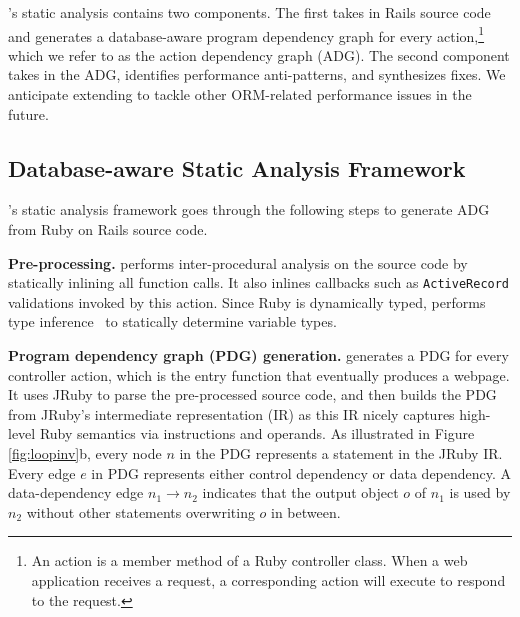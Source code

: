 \label{sec:impl}
\Tool's static analysis contains two components. The first takes in Rails source code and generates
a database-aware program dependency graph for every action,\footnote{An action is a member method of a
Ruby controller class. When a web application receives a request, a corresponding action will execute to respond to the request.}
which we refer to as the action
dependency graph (ADG). The second component takes in the ADG, identifies
performance anti-patterns, and synthesizes fixes. We anticipate extending \Tool to tackle other ORM-related performance issues in the future.



\subsection{Database-aware Static Analysis Framework} 
\Tool's static analysis framework goes through the following steps to generate ADG from Ruby on Rails source code.

\textbf{Pre-processing.} \Tool performs inter-procedural analysis on the source code by statically inlining all function calls. It also inlines callbacks such as {\tt ActiveRecord} validations invoked by this action. Since Ruby is dynamically typed, \Tool performs type inference~\cite{furr2009static} to statically determine variable types.




\textbf{Program dependency graph (PDG) generation.}
\Tool generates a PDG for every controller action, which is the entry function that eventually produces a webpage.   
It uses JRuby 
to parse the pre-processed source code, and then builds the PDG from JRuby's intermediate
representation (IR) as this IR nicely captures high-level Ruby semantics via instructions and operands.
As illustrated in Figure \ref{fig:loopinv}b, every node $n$ in the PDG represents a statement in the JRuby IR. 
Every edge $e$ in PDG represents either control dependency or data dependency.
A data-dependency
edge $n_1 \rightarrow n_2$ indicates that the output object $o$ of $n_1$ is used by $n_2$ without
other statements overwriting $o$ in between.

